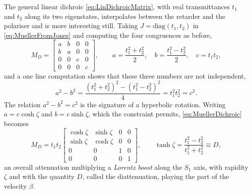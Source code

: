             The general linear dichroic \ref{eq:LinDichroicMatrix}, with real transmittances $t_1$ and $t_2$ along its two eigenstates, interpolates between the retarder and the polariser and is more interesting still. Taking $J=\text{diag}(t_1,t_2)$ in \ref{eq:MuellerFromJones} and computing the four congruences as before,
            \begin{equation}\label{eq:MuellerDichroic}
                M_D = \begin{bmatrix}
                    a & b & 0 & 0\\
                    b & a & 0 & 0\\
                    0 & 0 & c & 0\\
                    0 & 0 & 0 & c
                \end{bmatrix}, \qquad a=\frac{t_1^2+t_2^2}{2},\quad b=\frac{t_1^2-t_2^2}{2},\quad c=t_1t_2 ,
            \end{equation}
            and a one line computation shows that these three numbers are not independent,
            \begin{equation*}
                a^2-b^2 = \frac{\left(t_1^2+t_2^2\right)^2-\left(t_1^2-t_2^2\right)^2}{4} = t_1^2t_2^2 = c^2 .
            \end{equation*}
            The relation $a^2-b^2=c^2$ is the signature of a hyperbolic rotation. Writing $a=c\cosh\zeta$ and $b=c\sinh\zeta$, which the constraint permits, \ref{eq:MuellerDichroic} becomes
            \begin{equation}\label{eq:DichroicBoost}
                M_D = t_1t_2\begin{bmatrix}
                    \cosh\zeta & \sinh\zeta & 0 & 0\\
                    \sinh\zeta & \cosh\zeta & 0 & 0\\
                    0&0&1&0\\
                    0&0&0&1
                \end{bmatrix}, \qquad \tanh\zeta = \frac{t_1^2-t_2^2}{t_1^2+t_2^2} \equiv D ,
            \end{equation}
            an overall attenuation multiplying a \emph{Lorentz boost} along the $S_1$ axis, with rapidity $\zeta$ and with the quantity $D$, called the diattenuation, playing the part of the velocity $\beta$.

